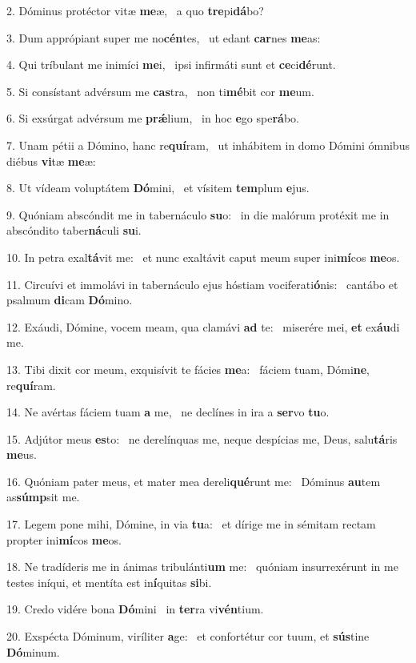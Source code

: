 2. Dóminus protéctor vitæ \textbf{me}æ, \ast\  a quo \textbf{tre}pi\textbf{dá}bo?\

3. Dum apprópiant super me no\textbf{cén}tes, \ast\  ut edant \textbf{car}nes \textbf{me}as:\

4. Qui tríbulant me inimíci \textbf{me}i, \ast\  ipsi infirmáti sunt et \textbf{ce}ci\textbf{dé}runt.\

5. Si consístant advérsum me \textbf{cas}tra, \ast\  non ti\textbf{mé}bit cor \textbf{me}um.\

6. Si exsúrgat advérsum me \textbf{prǽ}lium, \ast\  in hoc \textbf{e}go spe\textbf{rá}bo.\

7. Unam pétii a Dómino, hanc re\textbf{quí}ram, \ast\  ut inhábitem in domo Dómini ómnibus diébus \textbf{vi}tæ \textbf{me}æ:\

8. Ut vídeam voluptátem \textbf{Dó}mini, \ast\  et vísitem \textbf{tem}plum \textbf{e}jus.\

9. Quóniam abscóndit me in tabernáculo \textbf{su}o: \ast\  in die malórum protéxit me in abscóndito taber\textbf{ná}culi \textbf{su}i.\

10. In petra exal\textbf{tá}vit me: \ast\  et nunc exaltávit caput meum super ini\textbf{mí}cos \textbf{me}os.\

11. Circuívi et immolávi in tabernáculo ejus hóstiam vociferati\textbf{ó}nis: \ast\  cantábo et psalmum \textbf{di}cam \textbf{Dó}mino.\

12. Exáudi, Dómine, vocem meam, qua clamávi \textbf{ad} te: \ast\  miserére mei, \textbf{et} ex\textbf{áu}di me.\

13. Tibi dixit cor meum, exquisívit te fácies \textbf{me}a: \ast\  fáciem tuam, Dómi\textbf{ne}, re\textbf{quí}ram.\

14. Ne avértas fáciem tuam \textbf{a} me, \ast\  ne declínes in ira a \textbf{ser}vo \textbf{tu}o.\

15. Adjútor meus \textbf{es}to: \ast\  ne derelínquas me, neque despícias me, Deus, salu\textbf{tá}ris \textbf{me}us.\

16. Quóniam pater meus, et mater mea dereli\textbf{qué}runt me: \ast\  Dóminus \textbf{au}tem as\textbf{súmp}sit me.\

17. Legem pone mihi, Dómine, in via \textbf{tu}a: \ast\  et dírige me in sémitam rectam propter ini\textbf{mí}cos \textbf{me}os.\

18. Ne tradíderis me in ánimas tribulánti\textbf{um} me: \ast\  quóniam insurrexérunt in me testes iníqui, et mentíta est in\textbf{í}quitas \textbf{si}bi.\

19. Credo vidére bona \textbf{Dó}mini \ast\  in \textbf{ter}ra vi\textbf{vén}tium.\

20. Exspécta Dóminum, viríliter \textbf{a}ge: \ast\  et confortétur cor tuum, et \textbf{sús}tine \textbf{Dó}minum.\

